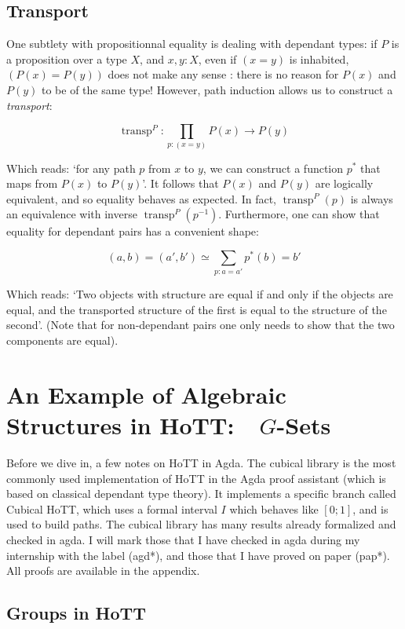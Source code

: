 \documentclass{article}
\DeclareMathOperator{\transp}{transp}
\begin{document}
\subsection{Transport}\label{transport}

One subtlety with propositionnal equality is dealing with dependant types: if $P$ is a proposition over a type $X$, and $x,y : X$, even if $(x = y)$ is inhabited, $(P(x) = P(y))$ does not make any sense : there is no reason for $P(x)$ and $P(y)$ to be of the same type! However, path induction allows us to construct a \emph{transport}:

\[\transp^{P} : \prod_{p : (x = y)} P(x) \to P(y) \]

Which reads: `for any path $p$ from $x$ to $y$, we can construct a function $p^{*}$ that maps from $P(x)$ to $P(y)$'. It follows that $P(x)$ and $P(y)$ are logically equivalent, and so equality behaves as expected. In fact, $\transp^{P}(p)$ is always an equivalence with inverse $\transp^{P}(p^{-1})$. Furthermore, one can show that equality for dependant pairs has a convenient shape:

\[(a, b) = (a', b') \simeq \sum_{p : a = a'}p^*(b) = b'\]

Which reads: `Two objects with structure are equal if and only if the objects are equal, and the transported structure of the first is equal to the structure of the second'. (Note that for non-dependant pairs one only needs to show that the two components are equal).

\section{An Example of Algebraic Structures in HoTT:\  $G$-Sets}

Before we dive in, a few notes on HoTT in Agda. The cubical library is the most commonly used implementation of HoTT in the Agda proof assistant (which is based on classical dependant type theory). It implements a specific branch called Cubical HoTT, which uses a formal interval $I$ which behaves like $[0;1]$, and is used to build paths. The cubical library has many results already formalized and checked in agda. I will mark those that I have checked in agda during my internship with the label (agd*), and those that I have proved on paper (pap*). All proofs are available in the appendix.


\subsection{Groups in HoTT}
\end{document}

